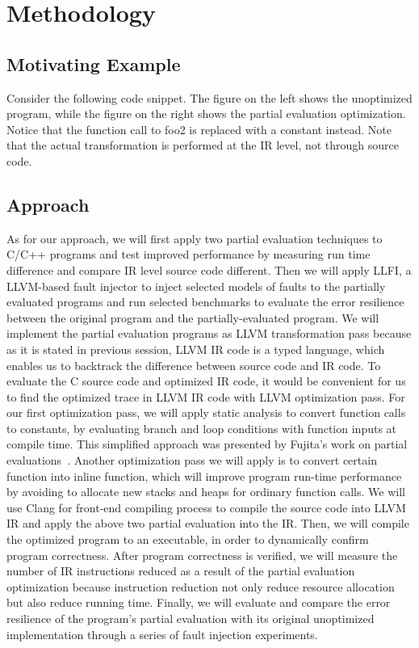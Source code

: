 \section{Methodology}
\label{sec:methodology}

\subsection{Motivating Example}
Consider the following code snippet.
The figure on the left shows the unoptimized program, while the figure on the right shows the partial evaluation optimization.
Notice that the function call to foo2 is replaced with a constant instead.
Note that the actual transformation is performed at the IR level, not through source code.


\subsection{Approach}
As for our approach, we will first apply two partial evaluation techniques to C/C++ programs and test improved performance by measuring run time difference and compare IR level source code different. Then we will apply LLFI, a LLVM-based fault injector to inject selected models of faults to the partially evaluated programs and run selected  benchmarks to evaluate the error resilience between the original program and the partially-evaluated program.   
We will implement the partial evaluation programs as LLVM transformation pass because as it is stated in previous session, LLVM IR code is a typed language, which enables us to backtrack the difference between source code and IR code. 
To evaluate the C source code and optimized IR code, it would be convenient for us to find the optimized trace in LLVM IR code with LLVM optimization pass.
For our first optimization pass, we will apply static analysis to convert function calls to constants, by evaluating branch and loop conditions with function inputs at compile time. 
This simplified approach was presented by Fujita’s work on partial evaluations~\cite{Fujita}.
Another optimization pass we will apply is to convert certain function into inline function, which will improve program run-time performance by avoiding to allocate new stacks and heaps for ordinary function calls. 
We will use Clang for front-end compiling process to compile the source code into LLVM IR and apply the above two partial evaluation into the IR. 
Then, we will compile the optimized program to an executable, in order to dynamically confirm program correctness.
After program correctness is verified, we will measure the number of IR instructions reduced as a result of the partial evaluation optimization because instruction reduction not only reduce resource allocation but also reduce running time. 
Finally, we will evaluate and compare the error resilience of the program's partial evaluation with its original unoptimized implementation through a series of fault injection experiments.
